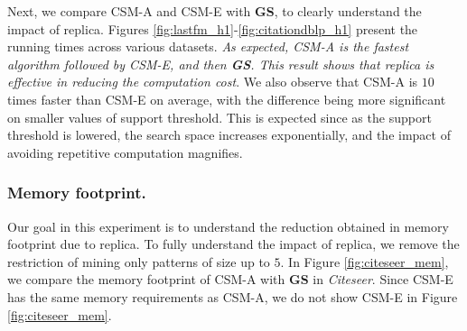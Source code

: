Next, we compare {\sf CSM-A} and {\sf CSM-E} with \textbf{GS},
to clearly understand the impact of replica. Figures \ref{fig:lastfm_h1}-\ref{fig:citationdblp_h1} present the running times across various datasets. %
 {\em As expected, {\sf CSM-A} is the fastest algorithm followed by {\sf CSM-E}, and then \textbf{GS}. %
This result shows that replica is effective in reducing the computation cost}. We also observe that {\sf CSM-A} is $10$ times faster than {\sf CSM-E} on average, with the difference being more significant on smaller values of support threshold. This is expected since as the support threshold is lowered, the search space increases exponentially, and the impact of avoiding repetitive computation magnifies.
%
%
%
%
%
\vspace{-0.1in}
\subsubsection{Memory footprint.} Our goal in this experiment is to understand the reduction obtained in memory footprint due to replica. To fully understand the impact of replica, we remove the restriction of mining only patterns of size up to $5$. %
In Figure \ref{fig:citeseer_mem}, we compare the memory footprint of {\sf CSM-A} with \textbf{GS} in {\em Citeseer}. Since {\sf CSM-E} has the same memory requirements as {\sf CSM-A}, we do not show {\sf CSM-E} in Figure \ref{fig:citeseer_mem}.

